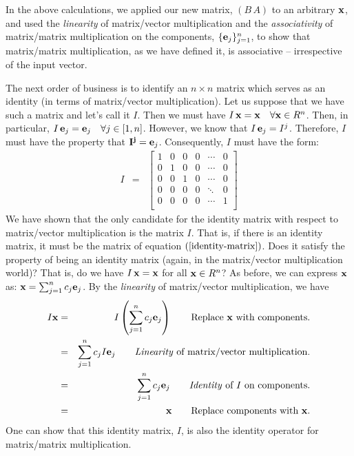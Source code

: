 \documentclass{article}
\begin{document}
In the above calculations, we applied our new matrix, $(B \, A)$ to an arbitrary ${\bf x}$, and 
used the {\em linearity\/} of matrix/vector multiplication and the {\em associativity\/}
of matrix/matrix multiplication on the components, $\{{\bf e}_j\}_{j=1}^n$, to show that matrix/matrix
multiplication, as we have defined it, is associative -- irrespective of the input vector.

The next order of business is to identify an $n \times n$ matrix which serves as an
identity (in terms of matrix/vector multiplication).
Let us suppose that we have such a matrix and let's call it $I$.
Then we must have $I \, {\bf x} = {\bf x} \quad \forall {\bf x} \in R^n$. 
Then, in particular,  
$I \, {\bf e}_{j} = {\bf e}_j \quad \forall j \in [1, n]$. 
However, we know that $I \, {\bf e}_j = I^j$. Therefore, $I$
must have the property that ${\bf I^j} = {\bf e}_j$. Consequently, $I$ must have the form:
\begin{eqnarray}
  I & = & \left[
      \begin{array}{cccccc}
        1 & 0 & 0 & 0 & \cdots & 0 \\
        0 & 1 & 0 & 0 & \cdots & 0 \\
        0 & 0 & 1 & 0 & \cdots & 0 \\
        0 & 0 & 0 & 0 & \ddots & 0 \\
        0 & 0 & 0 & 0 & \cdots & 1 \\
      \end{array}
  \right] \label{identity-matrix}
\end{eqnarray}
We have shown that the only candidate for the identity matrix with respect to 
matrix/vector multiplication is the matrix $I$. That is, if there is an 
identity matrix, it must be the matrix of equation $(\ref{identity-matrix})$. Does it satisfy
the property of being an identity matrix (again, in the matrix/vector multiplication world)?
That is, do we have $I \, {\bf x} = {\bf x}$ for all ${\bf x} \in R^n$?
As before, we can express ${\bf x}$ as: ${\bf x} = \sum_{j=1}^n c_j {\bf e}_j$.
By the {\em linearity\/} of matrix/vector multiplication, we have
\begin{eqnarray}
	I {\bf x} & = & I\left( \sum_{j=1}^n c_j {\bf e}_j \right)  \quad\quad \text{Replace ${\bf x}$ with components.} \nonumber \\
							 & = & \sum_{j=1}^n c_j  I{\bf e}_j \quad\quad \text{{\em Linearity\/} of matrix/vector multiplication.} \nonumber \\
							 & = & \sum_{j=1}^n c_j {\bf e}_j \quad\quad \text{{\em Identity\/} of $I$ on components.}\nonumber \\
							 & = & {\bf x} \quad\quad \text{Replace components with ${\bf x}$.}
\end{eqnarray}
One can show that this identity matrix, $I$, is also the identity operator for
matrix/matrix multiplication.
\end{document}
